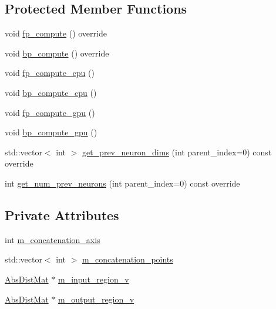 \subsection*{Protected Member Functions}
\begin{DoxyCompactItemize}
\item 
void \hyperlink{classlbann_1_1concatenation__layer_a27938ca2422fd120cfbdf823705af01a}{fp\+\_\+compute} () override
\item 
void \hyperlink{classlbann_1_1concatenation__layer_abd2a2a3aa260646c98d842993fee6247}{bp\+\_\+compute} () override
\item 
void \hyperlink{classlbann_1_1concatenation__layer_a53b3f53828d4982452dd6e79b8ebce50}{fp\+\_\+compute\+\_\+cpu} ()
\item 
void \hyperlink{classlbann_1_1concatenation__layer_a530ff478d02f3d69baf8432473979d00}{bp\+\_\+compute\+\_\+cpu} ()
\item 
void \hyperlink{classlbann_1_1concatenation__layer_afd6cb5cf50acf95c2e3ba2e365be3525}{fp\+\_\+compute\+\_\+gpu} ()
\item 
void \hyperlink{classlbann_1_1concatenation__layer_aa024e4ba8d10aec75c89075e6e0cc28d}{bp\+\_\+compute\+\_\+gpu} ()
\item 
std\+::vector$<$ int $>$ \hyperlink{classlbann_1_1concatenation__layer_af0e60f4a7e00657ceb429aaa8d7f5040}{get\+\_\+prev\+\_\+neuron\+\_\+dims} (int parent\+\_\+index=0) const override
\item 
int \hyperlink{classlbann_1_1concatenation__layer_aca8e6d21d827a3d5a8434db88bf3e63a}{get\+\_\+num\+\_\+prev\+\_\+neurons} (int parent\+\_\+index=0) const override
\end{DoxyCompactItemize}
\subsection*{Private Attributes}
\begin{DoxyCompactItemize}
\item 
int \hyperlink{classlbann_1_1concatenation__layer_a4ac4a931dc85d622e9ea8fddb9625d38}{m\+\_\+concatenation\+\_\+axis}
\item 
std\+::vector$<$ int $>$ \hyperlink{classlbann_1_1concatenation__layer_a363324fe6cd104740334f3396085328c}{m\+\_\+concatenation\+\_\+points}
\item 
\hyperlink{base_8hpp_a9a697a504ae84010e7439ffec862b470}{Abs\+Dist\+Mat} $\ast$ \hyperlink{classlbann_1_1concatenation__layer_afa68f2e5d3ea2de57f4974a37c01fc7b}{m\+\_\+input\+\_\+region\+\_\+v}
\item 
\hyperlink{base_8hpp_a9a697a504ae84010e7439ffec862b470}{Abs\+Dist\+Mat} $\ast$ \hyperlink{classlbann_1_1concatenation__layer_af141bf9cf1569121a65a68e4ae97855c}{m\+\_\+output\+\_\+region\+\_\+v}
\end{DoxyCompactItemize}
